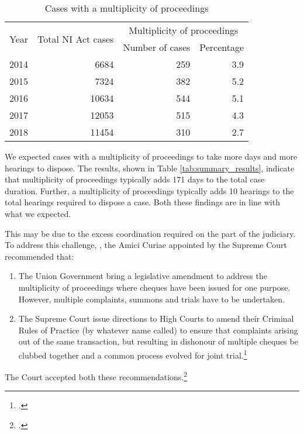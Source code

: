 \begin{longtable}{@{}lrrr@{}}
 \caption{Cases with a multiplicity of proceedings}\label{tab:mult_yearWise}\\
\toprule
\multirow{2}{*}{Year} & \multirow{2}{*}{Total NI Act cases} & \multicolumn{2}{c}{Multiplicity of proceedings}\\
\cmidrule{3-4}
&& Number of cases & Percentage \\
\midrule\endhead
2014 & 6684 & 259 & 3.9 \\
2015 & 7324 & 382 & 5.2 \\
2016 & 10634 & 544 & 5.1 \\
2017 & 12053 & 515 & 4.3 \\
2018 & 11454 & 310 & 2.7 \\
\bottomrule
\end{longtable}

We expected cases with a multiplicity of proceedings to take more days and more hearings to dispose. The results, shown in Table \ref{tab:summary_results}, indicate that multiplicity of proceedings typically adds 171 days to the total case duration. Further, a multiplicity of proceedings typically adds 10 hearings to the total hearings required to dispose a case. Both these findings are in line with what we expected.

This may be due to the excess coordination required on the part of the judiciary. To address this challenge, , the Amici Curiae appointed by the Supreme Court recommended that:

\begin{enumerate}
 \item The Union Government bring a legislative amendment to address the multiplicity of proceedings where cheques have been issued for one purpose. However, multiple complaints, summons and trials have to be undertaken. 
 \item The Supreme Court issue directions to High Courts to amend their Criminal Rules of Practice (by whatever name called) to ensure that complaints arising out of the same transaction, but resulting in dishonour of multiple cheques be clubbed together and a common process evolved for joint trial.\footcite{amicus2020_submission}
\end{enumerate}

The Court accepted both these recommendations.\footcite{sc2020_138}


